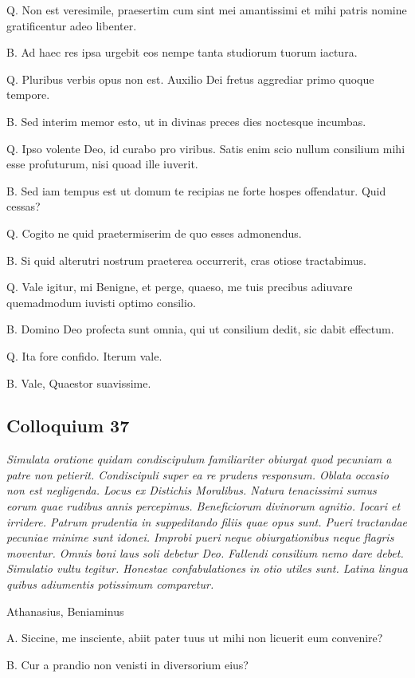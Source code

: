 \documentclass{article}
\begin{document}
Q. Non est veresimile, praesertim cum sint mei amantissimi et mihi patris nomine gratificentur adeo libenter.

B. Ad haec res ipsa urgebit eos nempe tanta studiorum tuorum iactura.

Q. Pluribus verbis opus non est. Auxilio Dei fretus aggrediar primo quoque tempore.

B. Sed interim memor esto, ut in divinas preces dies noctesque incumbas.

Q. Ipso volente Deo, id curabo pro viribus. Satis enim scio nullum consilium mihi esse profuturum, nisi quoad ille iuverit.

B. Sed iam tempus est ut domum te recipias ne forte hospes offendatur. Quid cessas?

Q. Cogito ne quid praetermiserim de quo esses admonendus.

B. Si quid alterutri nostrum praeterea occurrerit, cras otiose tractabimus.

Q. Vale igitur, mi Benigne, et perge, quaeso, me tuis precibus adiuvare quemadmodum iuvisti optimo consilio.

B. Domino Deo profecta sunt omnia, qui ut consilium dedit, sic dabit effectum.

Q. Ita fore confido. Iterum vale.

B. Vale, Quaestor suavissime.

\subsection{Colloquium 37}
\emph{Simulata oratione quidam condiscipulum familiariter obiurgat quod pecuniam a patre non petierit. Condiscipuli super ea re prudens responsum. Oblata occasio non est negligenda. Locus ex \emph{Distichis Moralibus}. Natura tenacissimi sumus eorum quae rudibus annis percepimus. Beneficiorum divinorum agnitio. Iocari et irridere. Patrum prudentia in suppeditando filiis quae opus sunt. Pueri tractandae pecuniae minime sunt idonei. Improbi pueri neque obiurgationibus neque flagris moventur. Omnis boni laus soli debetur Deo. Fallendi consilium nemo dare debet. Simulatio vultu tegitur. Honestae confabulationes in otio utiles sunt. Latina lingua quibus adiumentis potissimum comparetur.}

Athanasius, Beniaminus

A. Siccine, me insciente, abiit pater tuus ut mihi non licuerit eum convenire?

B. Cur a prandio non venisti in diversorium eius?
\end{document}
